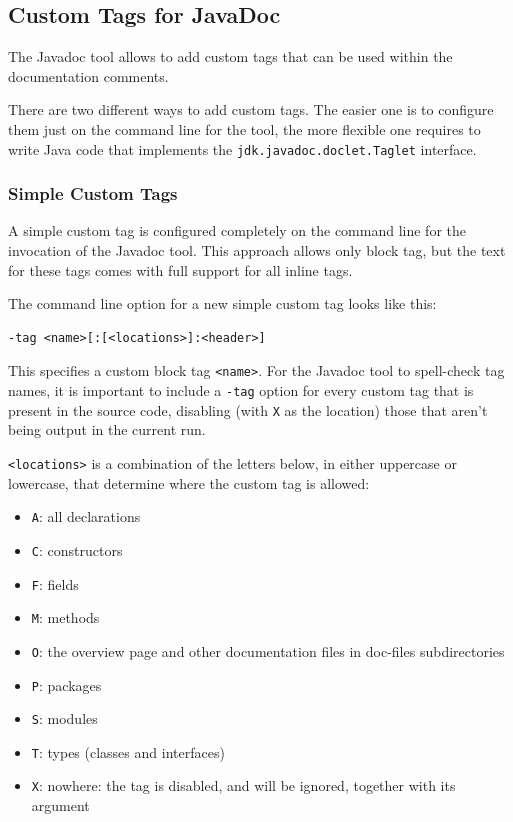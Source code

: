 \subsection{Custom Tags for JavaDoc}\label{sec:CustomTagsForJavaDoc}
The Javadoc tool allows to add custom tags that can be used within the documentation comments.

There are two different ways to add custom tags. The easier one is to configure them just on the command line for the tool, the more flexible one requires to write Java code that implements the \lstinline|jdk.javadoc.doclet.Taglet| \autocite{ORACLE_DOC_TAGLET_INTERFACE} interface.

\subsubsection{Simple Custom Tags}\label{sec:SimpleCustomTags}
A simple custom tag is configured completely on the command line for the invocation of the Javadoc tool. This approach allows only block tag, but the text for these tags comes with full support for all inline tags.

The command line option for a new simple custom tag looks like this:
\begin{lstlisting}[numbers=none,language={}]
-tag <name>[:[<locations>]:<header>]
\end{lstlisting}

This specifies a custom block tag \texttt{<name>}. For the Javadoc tool to spell-check tag names, it is important to include a \texttt{-tag} option for every custom tag that is present in the source code, disabling (with \texttt{X} as the location) those that aren't being output in the current run.

\texttt{<locations>} is a combination of the letters below, in either uppercase or lowercase, that determine where the custom tag is allowed:
\begin{itemize}[nosep]
	\item{\texttt{A}: all declarations}
	\item{\texttt{C}: constructors}
	\item{\texttt{F}: fields}
	\item{\texttt{M}: methods}
	\item{\texttt{O}: the overview page and other documentation files in doc-files subdirectories}
	\item{\texttt{P}: packages}
	\item{\texttt{S}: modules}
	\item{\texttt{T}: types (classes and interfaces)}
	\item{\texttt{X}: nowhere: the tag is disabled, and will be ignored, together with its argument}
\end{itemize}

